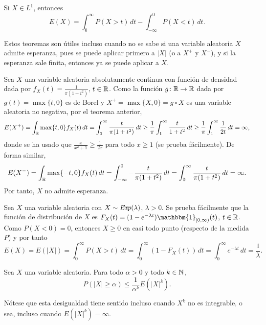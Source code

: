 \documentclass[a4paper, 11pt, extrafontsizes]{memoir}
\begin{document}
\begin{theorem}
    Si $X \in L^1$, entonces
    \[E(X) = \int_0^\infty P(X > t) \, dt - \int_{-\infty}^0 P(X < t) \, dt.\]
\end{theorem}

Estos teoremas son útiles incluso cuando no se sabe si una variable aleatoria $X$ admite esperanza, pues se puede aplicar primero a $|X|$ (o a $X^+$ y $X^-$), y si la esperanza sale finita, entonces ya se puede aplicar a $X$.

\begin{example}
    Sea $X$ una variable aleatoria absolutamente continua con función de densidad dada por $f_X(t) = \frac{1}{\pi(1+t^2)}$, $t \in \mathbb R$. Como la función $g \colon \mathbb R \to \mathbb R$ dada por $g(t)=\max\{t,0\}$ es de Borel y $X^+ = \max\{X,0\} = g \circ X$ es una variable aleatoria no negativa, por el teorema anterior,
    \[E(X^+) = \int_\mathbb R \max\{t,0\} f_X(t) \, dt = \int_0^\infty \frac{t}{\pi(1+t^2)} \, dt \geq \frac{1}{\pi}\int_1^\infty \frac{t}{1+t^2} \, dt \geq \frac{1}{\pi}\int_1^\infty \frac{1}{2t} \, dt = \infty,\]
    donde se ha usado que $\frac{x}{x^2+1} \geq \frac{1}{2x}$ para todo $x \geq 1$ (se prueba fácilmente). De forma similar,
    \[E(X^-) = \int_\mathbb R \max\{-t,0\} f_X(t) \, dt = \int_{-\infty}^0 -\frac{t}{\pi(1+t^2)} \, dt = \int_0^\infty \frac{t}{\pi(1+t^2)} \, dt = \infty.\]
    Por tanto, $X$ no admite esperanza.
\end{example}

\begin{example}
    Sea $X$ una variable aleatoria con $X \sim \textup{\emph{Exp}}(\lambda)$, $\lambda > 0$. Se prueba fácilmente que la función de distribución de $X$ es $F_X(t) = (1-e^{-\lambda t})\mathbbm{1}_{[0,\infty)}(t)$, $t \in \mathbb R$.
    Como $P(X < 0) = 0$, entonces $X \geq 0$ en casi todo punto (respecto de la medida $P$) y por tanto
    \[E(X) = E(|X|) = \int_0^\infty P(X > t) \, dt = \int_0^\infty ( 1 - F_X(t)) \, dt = \int_0^\infty e^{-\lambda t} \, dt = \frac{1}{\lambda}.\]
\end{example}

\begin{proposition}
    Sea $X$ una variable aleatoria. Para todo $\alpha > 0$ y todo $k \in \mathbb N$,
    \[P(|X| \geq \alpha) \leq \frac{1}{\alpha^k}E(|X|^k).\]
\end{proposition}

Nótese que esta desigualdad tiene sentido incluso cuando $X^k$ no es integrable, o sea, incluso cuando $E(|X|^k) = \infty$.
\end{document}
